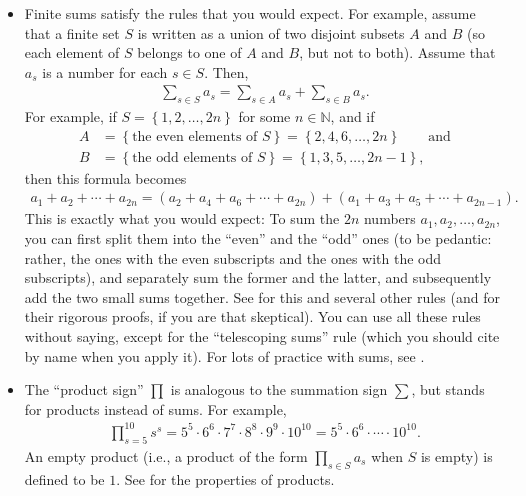 \documentclass[paper=a4, fontsize=12pt]{scrartcl} %
\newcommand{\NN}{\mathbb{N}} %
\newcommand{\set}[1]{\left\{ #1 \right\}}
\newcommand{\tup}[1]{\left( #1 \right)}
\let\sumnonlimits\sum
\let\prodnonlimits\prod
\renewcommand{\sum}{\sumnonlimits\limits}
\renewcommand{\prod}{\prodnonlimits\limits}
\theoremstyle{plainsl}
\theoremstyle{definition}
\theoremstyle{remark}
\begin{document}
\begin{itemize}
\item Finite sums satisfy the rules that you would expect.
      For example, assume that a finite set $S$ is written
      as a union of two disjoint subsets $A$ and $B$ (so
      each element of $S$ belongs to one of $A$ and $B$,
      but not to both).
      Assume that $a_s$ is a number for each $s \in S$.
      Then,
      \begin{align*}
      \sum_{s \in S} a_s = \sum_{s \in A} a_s + \sum_{s \in B} a_s .
      \end{align*}
      For example, if $S = \set{1, 2, \ldots, 2n}$ for some
      $n \in \NN$, and if
      \begin{align*}
      A &= \set{\text{the even elements of } S} = \set{2, 4, 6, \ldots, 2n}
      \qquad \text{and} \\
      B &= \set{\text{the odd elements of } S} = \set{1, 3, 5, \ldots, 2n-1} ,
      \end{align*}
      then this formula becomes
      \begin{align*}
      a_1 + a_2 + \cdots + a_{2n}
      = \tup{a_2 + a_4 + a_6 + \cdots + a_{2n}}
        + \tup{a_1 + a_3 + a_5 + \cdots + a_{2n-1}} .
      \end{align*}
      This is exactly what you would expect: To sum the
      $2n$ numbers $a_1, a_2, \ldots, a_{2n}$, you can first
      split them into the ``even'' and the ``odd'' ones
      (to be pedantic: rather, the ones with the even subscripts
      and the ones with the odd subscripts), and separately
      sum the former and the latter, and subsequently add the
      two small sums together.
      See \cite[Section 1.4.2]{detnotes} for this and several
      other rules (and for their rigorous proofs, if you are
      that skeptical).
      You can use all these rules without saying, except
      for the ``telescoping sums'' rule (which you should
      cite by name when you apply it).
      For lots of practice with sums, see \cite[Chapter 2 and
      further]{GKP}.

\item The ``product sign'' $\prod$ is analogous to the summation
      sign $\sum$, but stands for products instead of sums.
      For example,
      \begin{align*}
      \prod_{s = 5}^{10} s^s
      = 5^5 \cdot 6^6 \cdot 7^7 \cdot 8^8 \cdot 9^9 \cdot 10^{10}
      = 5^5 \cdot 6^6 \cdot \cdots \cdot 10^{10} .
      \end{align*}
      An empty product (i.e., a product of the form
      $\prod_{s \in S} a_s$ when $S$ is empty) is defined to
      be $1$.
      See \cite[Section 1.4.4]{detnotes} for the properties
      of products.

\end{itemize}
\end{document}
